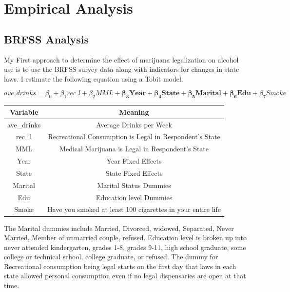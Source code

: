\documentclass[11pt]{article}
\begin{document}
\section{Empirical Analysis}

\subsection{BRFSS Analysis}

My First approach to determine the effect of marijuana legalization on alcohol use is to use the BRFSS survey data along with indicators for changes in state laws. I estimate the following equation using a Tobit model. 

$$
ave\_drinks = \beta_0 +  \beta_1  rec\_l  + \beta_2MML + \bm{\beta_3 Year} + \bm{\beta_4 State} + \bm{\beta_5 Marital} + \bm{\beta_6 Edu} + \beta_7 Smoke
$$

\begin{center}
	\begin{tabular}{||c | c||} 
		\hline
		Variable & Meaning  \\ [0.5ex] 
		\hline\hline
		ave\_drinks & Average Drinks per Week \\ 
		\hline 
		rec\_l & Recreational Consumption is Legal in Respondent's State  \\ 
		\hline
		MML & Medical Marijuana is Legal in Respondent's State  \\
		\hline
		Year & Year Fixed Effects \\
		\hline
		State & State Fixed Effects\\
		\hline
		Marital & Marital Status Dummies  \\ 
		\hline
		Edu & Education level Dummies \\
		\hline
		Smoke & Have you smoked at least 100 cigarettes in your entire life\\[1ex] 
		\hline
	\end{tabular}
\end{center}


The Marital dummies include Married, Divorced, widowed, Separated, Never Married, Member of unmarried couple, refused. Education level is broken up into never attended kindergarten, grades 1-8, grades 9-11, high school graduate, some college or technical school, college graduate, or refused. The dummy for Recreational consumption being legal starts on the first day that laws in each state allowed personal consumption even if no legal dispensaries are open at that time. \par 
\end{document}
